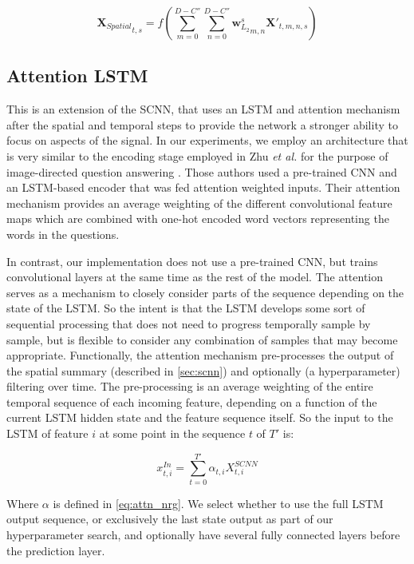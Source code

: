 \documentclass[fleqn,10pt]{wlscirep}
\begin{document}
\begin{equation} \label{eq:scnn_s2}
  {\boldsymbol{X}_{Spatial}}_{t, s} = f(\sum_{m=0}^{D-C''}\sum_{n=0}^{D-C''}{\boldsymbol{w}_{L_2}^s}_{m,n} \boldsymbol{X'}_{t, m, n, s})
\end{equation}

\subsection*{Attention LSTM}

This is an extension of the SCNN, that uses an LSTM and attention mechanism after the spatial and temporal steps to provide the network a stronger ability to focus on aspects of the signal. In our experiments, we employ an architecture that is very similar to the encoding stage employed in Zhu {\em et al.} for the purpose of image-directed question answering \cite{Zhu}. Those authors used a pre-trained CNN and an LSTM-based encoder that was fed attention weighted inputs. Their attention mechanism provides an average weighting of the different convolutional feature maps which are combined with one-hot encoded word vectors representing the words in the questions.

In contrast, our implementation does not use a pre-trained CNN, but trains convolutional layers at the same time as the rest of the model. The attention serves as a mechanism to closely consider parts of the sequence depending on the state of the LSTM. So the intent is that the LSTM develops some sort of sequential processing that does not need to progress temporally sample by sample, but is flexible to consider any combination of samples that may become appropriate. Functionally, the attention mechanism pre-processes the output of the spatial summary (described in \ref{sec:scnn}) and optionally (a hyperparameter) filtering over time. The pre-processing is an average weighting of the entire temporal sequence of each incoming feature, depending on a function of the current LSTM hidden state and the feature sequence itself. So the input to the LSTM of feature $i$ at some point in the sequence $t$ of $T'$ is:

\begin{equation}
  x_{t,i}^{In} = \sum_{t=0}^{T'} \alpha_{t,i} X_{t,i}^{SCNN}
\end{equation}

Where $\alpha$ is defined in \ref{eq:attn_nrg}. We select whether to use the full LSTM output sequence, or exclusively the last state output as part of our hyperparameter search, and optionally have several fully connected layers before the prediction layer.
\end{document}
